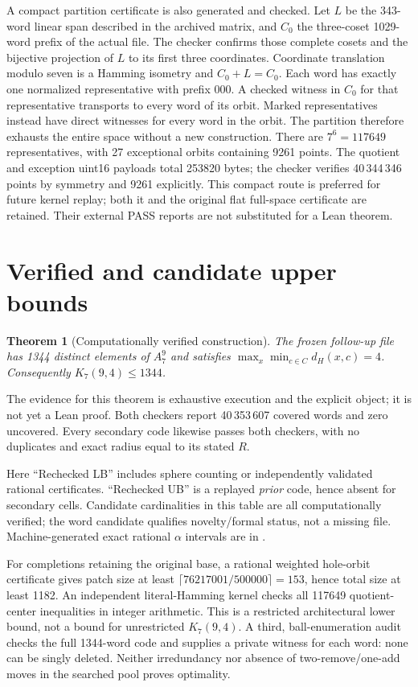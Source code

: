\documentclass[11pt]{article}
\newtheorem{theorem}{Theorem}
\begin{document}
A compact partition certificate is also generated and checked. Let $L$ be the
343-word linear span described in the archived matrix, and $C_0$ the three-coset
1029-word prefix of the actual file. The checker confirms those complete cosets
and the bijective projection of $L$ to its first three coordinates. Coordinate
translation modulo seven is a Hamming isometry and $C_0+L=C_0$. Each word has
exactly one normalized representative with prefix $000$. A checked witness in
$C_0$ for that representative transports to every word of its orbit. Marked
representatives instead have direct witnesses for every word in the orbit.
The partition therefore exhausts the entire space without a new construction.
There are $7^6=117649$ representatives, with 27 exceptional orbits containing
9261 points. The quotient and exception uint16 payloads total 253820 bytes;
the checker verifies 40\,344\,346 points by symmetry and 9261 explicitly.
This compact route is preferred for future kernel replay; both it and the
original flat full-space certificate are retained. Their external PASS reports
are not substituted for a Lean theorem.

\section{Verified and candidate upper bounds}
\begin{theorem}[Computationally verified construction]
The frozen follow-up file has 1344 distinct elements of $A_7^9$ and satisfies
$\max_x\min_{c\in C}d_H(x,c)=4$. Consequently $K_7(9,4)\le1344$.
\end{theorem}
\noindent The evidence for this theorem is exhaustive execution and the explicit
object; it is not yet a Lean proof. Both checkers report 40\,353\,607 covered
words and zero uncovered. Every secondary code likewise passes both checkers,
with no duplicates and exact radius equal to its stated $R$.

\begin{center}\small

\end{center}
Here ``Rechecked LB'' includes sphere counting or independently validated rational
certificates. ``Rechecked UB'' is a replayed \emph{prior} code, hence absent for
secondary cells. Candidate cardinalities in this table are all computationally
verified; the word candidate qualifies novelty/formal status, not a missing file.
Machine-generated exact rational $\alpha$ intervals are in .

For completions retaining the original base, a rational weighted hole-orbit
certificate gives patch size at least $\lceil76217001/500000\rceil=153$,
hence total size at least 1182. An independent literal-Hamming kernel checks
all 117649 quotient-center inequalities in integer arithmetic. This is a
restricted architectural lower bound, not a bound for unrestricted $K_7(9,4)$.
A third, ball-enumeration audit checks the full 1344-word code and supplies a
private witness for each word: none can be singly deleted. Neither irredundancy
nor absence of two-remove/one-add moves in the searched pool proves optimality.
\end{document}
